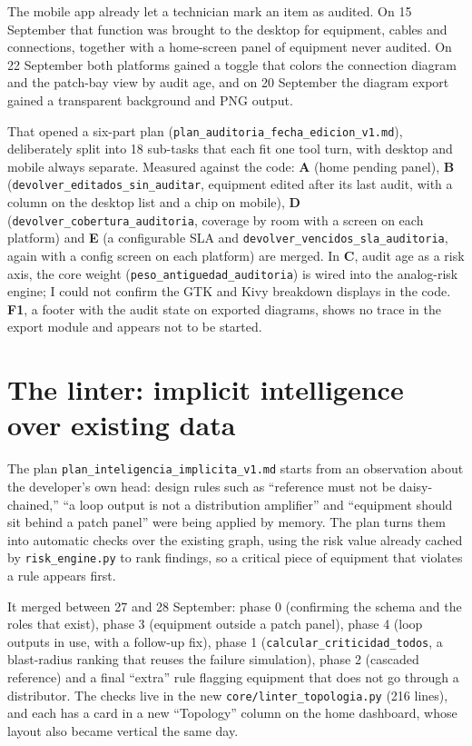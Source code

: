 \documentclass[10.4pt,twocolumn]{article}
\begin{document}
The mobile app already let a technician mark an item as audited. On 15 September that function was brought to the desktop for equipment, cables and connections, together with a home-screen panel of equipment never audited. On 22 September both platforms gained a toggle that colors the connection diagram and the patch-bay view by audit age, and on 20 September the diagram export gained a transparent background and PNG output.

That opened a six-part plan (\texttt{plan\_auditoria\_fecha\_edicion\_v1.md}), deliberately split into 18 sub-tasks that each fit one tool turn, with desktop and mobile always separate. Measured against the code: \textbf{A} (home pending panel), \textbf{B} (\texttt{devolver\_editados\_sin\_auditar}, equipment edited after its last audit, with a column on the desktop list and a chip on mobile), \textbf{D} (\texttt{devolver\_cobertura\_auditoria}, coverage by room with a screen on each platform) and \textbf{E} (a configurable SLA and \texttt{devolver\_vencidos\_sla\_auditoria}, again with a config screen on each platform) are merged. In \textbf{C}, audit age as a risk axis, the core weight (\texttt{peso\_antiguedad\_auditoria}) is wired into the analog-risk engine; I could not confirm the GTK and Kivy breakdown displays in the code. \textbf{F1}, a footer with the audit state on exported diagrams, shows no trace in the export module and appears not to be started.

\section{The linter: implicit intelligence over existing data}

The plan \texttt{plan\_inteligencia\_implicita\_v1.md} starts from an observation about the developer's own head: design rules such as ``reference must not be daisy-chained,'' ``a loop output is not a distribution amplifier'' and ``equipment should sit behind a patch panel'' were being applied by memory. The plan turns them into automatic checks over the existing graph, using the risk value already cached by \texttt{risk\_engine.py} to rank findings, so a critical piece of equipment that violates a rule appears first.

It merged between 27 and 28 September: phase 0 (confirming the schema and the roles that exist), phase 3 (equipment outside a patch panel), phase 4 (loop outputs in use, with a follow-up fix), phase 1 (\texttt{calcular\_criticidad\_todos}, a blast-radius ranking that reuses the failure simulation), phase 2 (cascaded reference) and a final ``extra'' rule flagging equipment that does not go through a distributor. The checks live in the new \texttt{core/linter\_topologia.py} (216 lines), and each has a card in a new ``Topology'' column on the home dashboard, whose layout also became vertical the same day.
\end{document}
